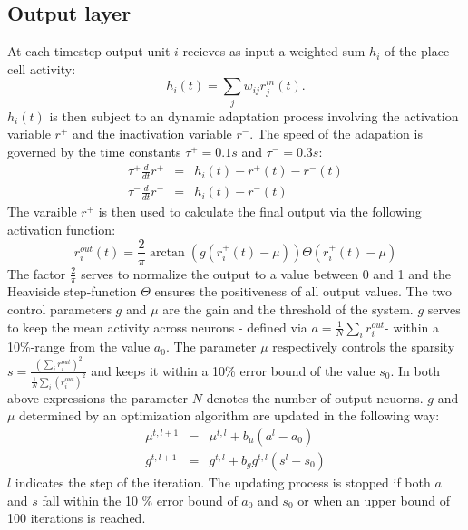 \documentclass[a4paper, 12pt]{article}
\begin{document}
\subsection{Output layer}
At each timestep output unit $i$ recieves as input a weighted sum $h_i$ of the place cell activity: 
	\begin{equation}
	h_i(t)=\sum_jw_{ij}r_j^{in}(t).
	\end{equation}
$h_i(t)$ is then subject to an dynamic adaptation process involving the activation variable $r^+$ and the inactivation variable $r^-$. The speed of the adapation is governed by the time constants $\tau^+=0.1 s$ and $\tau^-=0.3 s$:
	\begin{eqnarray}
	\tau^+\frac{d}{dt}r^+ &=& h_i(t)-r^+(t)-r^-(t)\\
	\tau^-\frac{d}{dt}r^- &=& h_i(t)-r^-(t)
	\end{eqnarray}
The varaible $r^+$ is then used to calculate the final output via the following activation function: 
	\begin{equation}
	r_i^{out}(t)=\frac{2}{\pi}\arctan(g(r_i^+(t)-\mu))\Theta( r_i^+(t)-\mu)
	\end{equation}
The factor $\frac{2}{\pi}$ serves to normalize the output to a value between 0 and 1 and the Heaviside step-function $\Theta$ ensures the positiveness of all output values.  \newline
The two control parameters $g$ and $\mu$ are the gain and the threshold of the system. $g$ serves to keep the mean activity across neurons - defined via $a= \frac{1}{N}\sum_ir_i^{out}$- within a 10\%-range from the value $a_0$. The parameter $\mu$ respectively controls the sparsity $s=\frac{(\sum_ir_i^{out})^2}{\frac{1}{N}\sum_i (r_i^{out})^2}$ and keeps it within a 10\% error bound of the value $s_0$. In both above expressions the parameter $N$ denotes the number of output neuorns. $g$ and $\mu$ determined by an optimization algorithm are updated in the following way: 
	\begin{eqnarray}
	\mu^{t, l+1} &=& \mu^{t,l}+b_\mu(a^{l}-a_0)\\
	g^{t,l+1} &=& g^{t,l}+ b_gg^{t,l}(s^l-s_0)
	\end{eqnarray}
\noindent $l$ indicates the step of the iteration. The updating process is stopped if both $a$ and $s$ fall within the 10 \% error bound of $a_0$ and $s_0$ or when an upper bound of 100 iterations is reached. 
	
\end{document}
